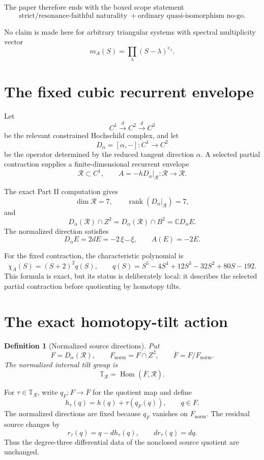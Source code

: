 \documentclass[11pt]{amsart}
\newtheorem{definition}[theorem]{Definition}
\newcommand{\C}{\mathbb C}
\newcommand{\Hom}{\operatorname{Hom}}
\newcommand{\rank}{\operatorname{rank}}
\begin{document}
The paper therefore ends with the boxed scope statement
\[
\boxed{\text{strict/resonance-faithful naturality}\;+
       \text{ordinary quasi-isomorphism no-go}.}
\]

No claim is made here for arbitrary triangular systems with spectral multiplicity vector
\[
m_A(S)=\prod_\lambda(S-\lambda)^{e_\lambda}.
\]

\section{The fixed cubic recurrent envelope}

Let
\[
C^1\xrightarrow{d}C^2\xrightarrow{d}C^3
\]
be the relevant constrained Hochschild complex, and let
\[
D_\alpha=[\alpha,-]:C^1\longrightarrow C^2
\]
be the operator determined by the reduced tangent direction \(\alpha\).  A selected partial contraction supplies a finite-dimensional recurrent envelope
\[
\mathcal R\subset C^1,
\qquad
A=-hD_\alpha\big|_{\mathcal R}:\mathcal R\longrightarrow\mathcal R.
\]

The exact Part II computation gives
\[
\dim\mathcal R=7,
\qquad
\rank(D_\alpha|_{\mathcal R})=7,
\]
and
\[
D_\alpha(\mathcal R)\cap Z^2
=D_\alpha(\mathcal R)\cap B^2
=\C D_\alpha E.
\]
The normalized direction satisfies
\[
D_\alpha E=2dE=-2\,\xi\smile\xi,
\qquad
A(E)=-2E.
\]

For the fixed contraction, the characteristic polynomial is
\[
\chi_A(S)=(S+2)^2q(S),
\qquad
q(S)=S^5-4S^4+12S^3-32S^2+80S-192.
\]
This formula is exact, but its status is deliberately local: it describes the selected partial contraction before quotienting by homotopy tilts.

\section{The exact homotopy-tilt action}

\begin{definition}[Normalized source directions]
Put
\[
F=D_\alpha(\mathcal R),
\qquad
F_{\mathrm{norm}}=F\cap Z^2,
\qquad
\overline F=F/F_{\mathrm{norm}}.
\]
The normalized internal tilt group is
\[
\mathbb T_{\mathcal R}=\Hom(\overline F,\mathcal R).
\]
\end{definition}

For \(\tau\in\mathbb T_{\mathcal R}\), write \(q_F:F\to\overline F\) for the quotient map and define
\[
h_\tau(q)=h(q)+\tau(q_F(q)),
\qquad q\in F.
\]
The normalized directions are fixed because \(q_F\) vanishes on \(F_{\mathrm{norm}}\).  The residual source changes by
\[
r_\tau(q)=q-dh_\tau(q),
\qquad
dr_\tau(q)=dq.
\]
Thus the degree-three differential data of the nonclosed source quotient are unchanged.
\end{document}
